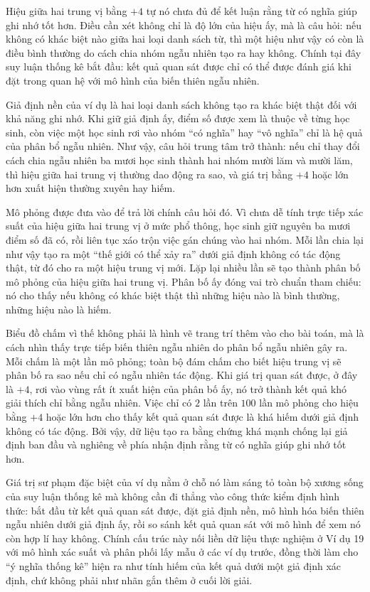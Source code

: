   {
    Hiệu giữa hai trung vị bằng $+4$ tự nó chưa đủ để kết luận rằng từ có nghĩa giúp ghi nhớ tốt hơn. Điều cần xét không chỉ là độ lớn của hiệu ấy, mà là câu hỏi: nếu không có khác biệt nào giữa hai loại danh sách từ, thì một hiệu như vậy có còn là điều bình thường do cách chia nhóm ngẫu nhiên tạo ra hay không. Chính tại đây suy luận thống kê bắt đầu: kết quả quan sát được chỉ có thể được đánh giá khi đặt trong quan hệ với mô hình của biến thiên ngẫu nhiên.

    Giả định nền của ví dụ là hai loại danh sách không tạo ra khác biệt thật đối với khả năng ghi nhớ. Khi giữ giả định ấy, điểm số được xem là thuộc về từng học sinh, còn việc một học sinh rơi vào nhóm ``có nghĩa'' hay ``vô nghĩa'' chỉ là hệ quả của phân bổ ngẫu nhiên. Như vậy, câu hỏi trung tâm trở thành: nếu chỉ thay đổi cách chia ngẫu nhiên ba mươi học sinh thành hai nhóm mười lăm và mười lăm, thì hiệu giữa hai trung vị thường dao động ra sao, và giá trị bằng $+4$ hoặc lớn hơn xuất hiện thường xuyên hay hiếm.

    Mô phỏng được đưa vào để trả lời chính câu hỏi đó. Vì chưa dễ tính trực tiếp xác suất của hiệu giữa hai trung vị ở mức phổ thông, học sinh giữ nguyên ba mươi điểm số đã có, rồi liên tục xáo trộn việc gán chúng vào hai nhóm. Mỗi lần chia lại như vậy tạo ra một “thế giới có thể xảy ra” dưới giả định không có tác động thật, từ đó cho ra một hiệu trung vị mới. Lặp lại nhiều lần sẽ tạo thành phân bố mô phỏng của hiệu giữa hai trung vị. Phân bố ấy đóng vai trò chuẩn tham chiếu: nó cho thấy nếu không có khác biệt thật thì những hiệu nào là bình thường, những hiệu nào là hiếm.

    Biểu đồ chấm vì thế không phải là hình vẽ trang trí thêm vào cho bài toán, mà là cách nhìn thấy trực tiếp biến thiên ngẫu nhiên do phân bổ ngẫu nhiên gây ra. Mỗi chấm là một lần mô phỏng; toàn bộ đám chấm cho biết hiệu trung vị sẽ phân bố ra sao nếu chỉ có ngẫu nhiên tác động. Khi giá trị quan sát được, ở đây là $+4$, rơi vào vùng rất ít xuất hiện của phân bố ấy, nó trở thành kết quả khó giải thích chỉ bằng ngẫu nhiên. Việc chỉ có $2$ lần trên $100$ lần mô phỏng cho hiệu bằng $+4$ hoặc lớn hơn cho thấy kết quả quan sát được là khá hiếm dưới giả định không có tác động. Bởi vậy, dữ liệu tạo ra bằng chứng khá mạnh chống lại giả định ban đầu và nghiêng về phía nhận định rằng từ có nghĩa giúp ghi nhớ tốt hơn.

    Giá trị sư phạm đặc biệt của ví dụ nằm ở chỗ nó làm sáng tỏ toàn bộ xương sống của suy luận thống kê mà không cần đi thẳng vào công thức kiểm định hình thức: bắt đầu từ kết quả quan sát được, đặt giả định nền, mô hình hóa biến thiên ngẫu nhiên dưới giả định ấy, rồi so sánh kết quả quan sát với mô hình để xem nó còn hợp lí hay không. Chính cấu trúc này nối liền dữ liệu thực nghiệm ở Ví dụ 19 với mô hình xác suất và phân phối lấy mẫu ở các ví dụ trước, đồng thời làm cho ``ý nghĩa thống kê'' hiện ra như tính hiếm của kết quả dưới một giả định xác định, chứ không phải như nhãn gắn thêm ở cuối lời giải.
  }

\CloseGrid